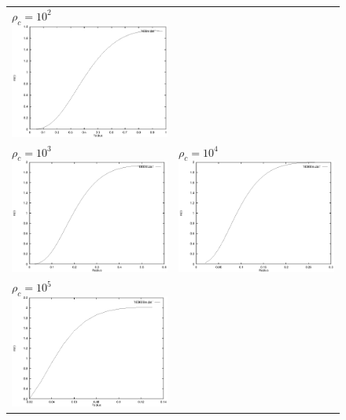 \documentclass[a4paper]{IEEEtran}
\begin{document}
\begin{figure}
\begin{center}
\begin{tabular}{p{7cm}p{7cm}}
        $\rho_c = 10^2$ \newline \includegraphics[width=7cm]{figures/100m.eps}    
        \\
        $\rho_c = 10^3$ \newline \includegraphics[width=7cm]{figures/1000m.eps}  & 
        $\rho_c = 10^4$ \newline \includegraphics[width=7cm]{figures/10000m.eps}   
        \\
        $\rho_c = 10^5$ \newline \includegraphics[width=7cm]{figures/100000m.eps}  & 

\end{tabular}
\end{center}
\end{figure}
\end{document}
